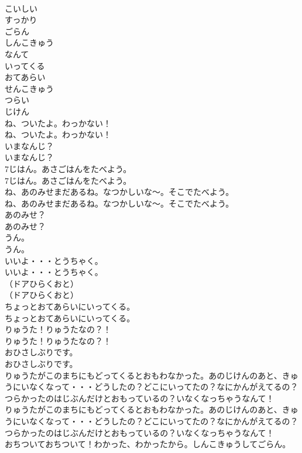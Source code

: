\documentclass[8pt]{extreport}
\begin{document}
\begin{CJK}{UTF8}{min}
\\	こいしい
\\	すっかり
\\	ごらん
\\	しんこきゅう
\\	なんて
\\	いってくる
\\	おてあらい
\\	せんこきゅう
\\	つらい
\\	じけん
\\	ね、ついたよ。わっかない！
\\	ね、ついたよ。わっかない！
\\	いまなんじ？
\\	いまなんじ？
\\	7じはん。あさごはんをたべよう。
\\	7じはん。あさごはんをたべよう。
\\	ね、あのみせまだあるね。なつかしいな～。そこでたべよう。
\\	ね、あのみせまだあるね。なつかしいな～。そこでたべよう。
\\	あのみせ？
\\	あのみせ？
\\	うん。
\\	うん。
\\	いいよ・・・とうちゃく。
\\	いいよ・・・とうちゃく。
\\	（ドアひらくおと）
\\	（ドアひらくおと）
\\	ちょっとおてあらいにいってくる。
\\	ちょっとおてあらいにいってくる。
\\	りゅうた！りゅうたなの？！
\\	りゅうた！りゅうたなの？！
\\	おひさしぶりです。
\\	おひさしぶりです。
\\	りゅうたがこのまちにもどってくるとおもわなかった。あのじけんのあと、きゅうにいなくなって・・・どうしたの？どこにいってたの？なにかんがえてるの？つらかったのはじぶんだけとおもっているの？いなくなっちゃうなんて！
\\	りゅうたがこのまちにもどってくるとおもわなかった。あのじけんのあと、きゅうにいなくなって・・・どうしたの？どこにいってたの？なにかんがえてるの？つらかったのはじぶんだけとおもっているの？いなくなっちゃうなんて！
\\	おちついておちついて！わかった、わかったから。しんこきゅうしてごらん。

\end{CJK}
\end{document}
